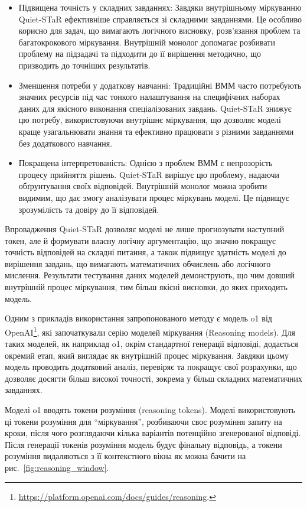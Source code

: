 \begin{itemize}
    \item {Підвищена точність у складних завданнях}: Завдяки внутрішньому міркуванню Quiet-STaR ефективніше справляється зі складними завданнями. Це особливо корисно для задач, що вимагають логічного висновку, розв’язання проблем та багатокрокового міркування. Внутрішній монолог допомагає розбивати проблему на підзадачі та підходити до її вирішення методично, що призводить до точніших результатів.

    \item {Зменшення потреби у додаткову навчанні}: Традиційні ВММ часто потребують значних ресурсів під час тонкого налаштування на специфічних наборах даних для якісного виконання спеціалізованих завдань. Quiet-STaR знижує цю потребу, використовуючи внутрішнє міркування, що дозволяє моделі краще узагальнювати знання та ефективно працювати з різними завданнями без додаткового навчання.

    \item {Покращена інтерпретованість}: Однією з проблем ВММ є непрозорість процесу прийняття рішень. Quiet-STaR вирішує цю проблему, надаючи обґрунтування своїх відповідей. Внутрішній монолог можна зробити видимим, що дає змогу аналізувати процес міркувань моделі. Це підвищує зрозумілість та довіру до її відповідей.
\end{itemize}

Впровадження Quiet-STaR дозволяє моделі не лише прогнозувати наступний токен, але й формувати власну логічну аргументацію, що значно покращує точність відповідей на складні питання, а також підвищує здатність моделі до вирішення завдань, що вимагають математичних обчислень або логічного мислення. Результати тестування даних моделей демонструють, що чим довший внутрішній процес міркування, тим більш якісні висновки, до яких приходить модель.

Одним з прикладів використання запропонованого методу є модель o1 від OpenAI\footnote{\url{https://platform.openai.com/docs/guides/reasoning}.}, які започаткували серію моделей міркування (Reasoning models). Для таких моделей, як наприклад o1, окрім стандартної генерації відповіді, додається окремий етап, який виглядає як внутрішній процес міркування. Завдяки цьому модель проводить додатковий аналіз, перевіряє та покращує свої розрахунки, що дозволяє досягти більш високої точності, зокрема у більш складних математичних завданнях.

Моделі o1 вводять токени розуміння (reasoning tokens). Моделі використовують ці токени розуміння для ``міркування'', розбиваючи своє розуміння запиту на кроки, після чого розглядаючи кілька варіантів потенційно згенерованої відповіді. Після генерації токенів розуміння модель будує фінальну відповідь, а токени розуміння видаляються з її контекстного вікна як можна бачити на рис.~\ref{fig:reasoning_window}.

